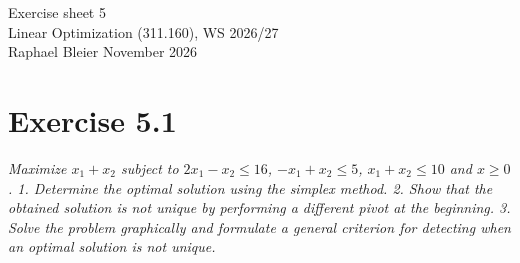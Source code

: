 \documentclass[a4paper,11pt]{article}
\newif\ifexplain
\newcommand{\aufgabe}[1]{\section*{Exercise #1}}
\newcommand{\angabe}[1]{\textit{#1}\par\smallskip}
\newcommand{\explain}[1]{\ifexplain\begin{erklbox}#1\end{erklbox}\fi}
\begin{document}
\begin{center}
{\Large Exercise sheet 5}\\
Linear Optimization (311.160), WS 2026/27\\
Raphael Bleier  November 2026
\end{center}
\explain{Ein Simplex-Schritt tauscht eine Basisvariable gegen eine Nichtbasisvariable. Die eintretende Variable hat positive reduzierte Kosten, die austretende bestimmt der Quotiententest. Sind danach alle reduzierten Kosten höchstens null, ist die Basislösung optimal. Auf diesem Blatt gibt es davon zwei, weil am Optimum eine reduzierte Kosten null bleibt und ein positiver Schritt noch zulässig ist. Kurz: zwei Ecken, ein Wert.}

\aufgabe{5.1}
\angabe{Maximize $x_1+x_2$ subject to $2x_1-x_2\leq 16$, $-x_1+x_2\leq 5$, $x_1+x_2\leq 10$ and $x\geq 0$.
1. Determine the optimal solution using the simplex method.
2. Show that the obtained solution is not unique by performing a different pivot at the beginning.
3. Solve the problem graphically and formulate a general criterion for detecting when an optimal solution is not unique.}
\explain{Die Zielfunktion steigt in beide Achsenrichtungen gleich stark. Deshalb haben $x_1$ und $x_2$ im Startdictionary dieselben reduzierten Kosten. Welche wir zuerst wählen, ist beides ein gültiger Simplex-Schritt. Die beiden Wege enden an den Endpunkten derselben optimalen Kante. Beide zählen.}
\end{document}

